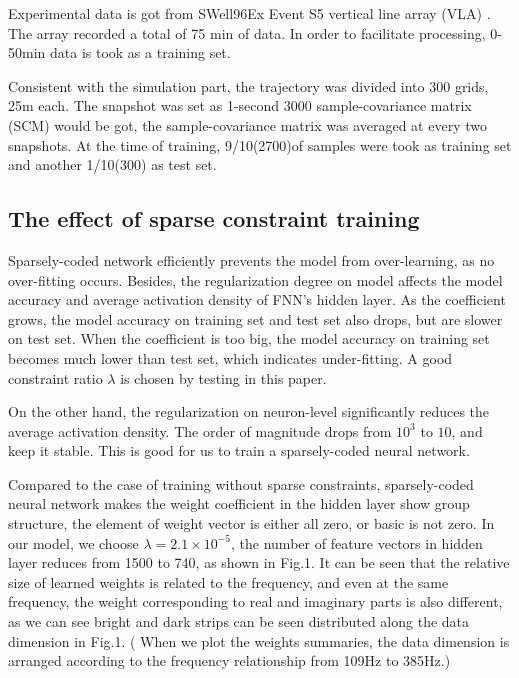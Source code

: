 Experimental data is got from SWell96Ex Event S5 vertical line array (VLA) . The array recorded a total of 75 min of data. In order to facilitate processing, 0\--50min data is took as a training set.

Consistent with the simulation part, the trajectory was divided into 300 grids, 25m each. The snapshot was set as 1-second 3000 sample-covariance matrix (SCM) would be got, the sample-covariance matrix was averaged at every two snapshots.
At the time of training, 9/10(2700)of samples were took as training set and another 1/10(300) as test set.

\subsection{The effect of sparse constraint training}
Sparsely-coded network efficiently prevents the model from over-learning, as no over-fitting occurs.
Besides, the regularization degree on model affects the model accuracy and average activation density of FNN's hidden layer. As the coefficient grows, the model accuracy on training set and test set also drops, but are slower on test set. When the coefficient is too big, the model accuracy on training set becomes much lower than test set, which indicates under-fitting.
A good constraint ratio $\lambda$ is chosen by testing in this paper.

On the other hand, the regularization on neuron-level significantly reduces the average activation density.
The order of magnitude drops from $10^{3}$ to $10$, and keep it stable. This is good for us to train a sparsely-coded neural network.

Compared to the case of training without sparse constraints, sparsely-coded neural network makes the weight coefficient in the hidden layer show group structure, the element of weight vector is either all zero, or basic is not zero.
In our model, we choose $\lambda=2.1 \times 10^{-5} $, the number of feature vectors in hidden layer reduces from 1500 to 740, as shown in Fig.1. It can be seen that the relative size of learned weights is related to the frequency, and even at the same frequency, the weight corresponding
to real and imaginary parts is also different, as we can see bright and dark strips can be seen distributed along the data dimension in Fig.1. ( When we plot the weights summaries, the data dimension is arranged according to the frequency relationship from 109Hz to 385Hz.)

